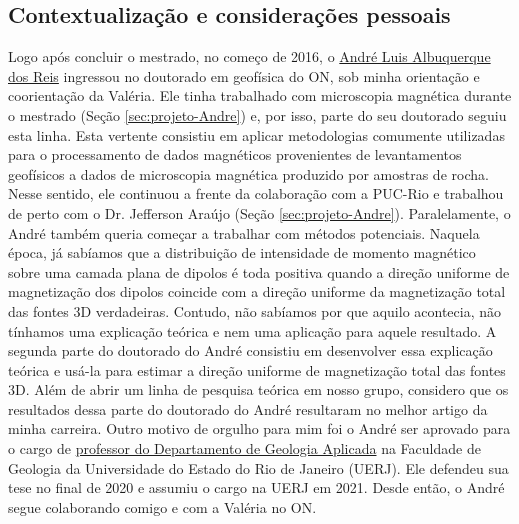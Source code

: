 \subsection*{Contextualização e considerações pessoais}

Logo após concluir o mestrado, no começo de 2016, o
\href{https://lattes.cnpq.br/1075610796165589}{André Luis Albuquerque dos Reis}
ingressou no doutorado em geofísica do ON, sob minha orientação e coorientação da
Valéria. Ele tinha trabalhado com microscopia magnética durante o
mestrado (Seção \ref{sec:projeto-Andre}) e, por isso, parte do seu doutorado seguiu esta
linha. Esta vertente consistiu em aplicar metodologias comumente utilizadas para o
processamento de dados magnéticos provenientes de levantamentos geofísicos a dados de
microscopia magnética produzido por amostras de rocha. Nesse sentido, ele continuou a 
frente da colaboração com a PUC-Rio e trabalhou de perto com o Dr. Jefferson Araújo
(Seção \ref{sec:projeto-Andre}).
Paralelamente, o André também queria começar a trabalhar com métodos potenciais.
Naquela época, já sabíamos que a distribuição de intensidade de momento magnético sobre
uma camada plana de dipolos é toda positiva quando a direção uniforme de magnetização dos
dipolos coincide com a direção uniforme da magnetização total das fontes 3D verdadeiras.
Contudo, não sabíamos por que aquilo acontecia, não tínhamos uma explicação teórica e
nem uma aplicação para aquele resultado. 
A segunda parte do doutorado do André consistiu em desenvolver
essa explicação teórica e usá-la para estimar a direção uniforme de magnetização total 
das fontes 3D. Além de abrir um linha de pesquisa teórica em nosso grupo, considero
que os resultados dessa parte do doutorado do André resultaram no melhor artigo da minha
carreira. Outro motivo de orgulho para mim foi o André ser aprovado para o cargo de
\href{https://www.fgel.uerj.br/site/departamentos/depto-de-geologia-aplicada/dgap-quadro-de-pessoal/}{professor do Departamento de Geologia Aplicada} 
na Faculdade de Geologia da Universidade do Estado do Rio de Janeiro (UERJ).
Ele defendeu sua tese no final de 2020 e assumiu o cargo na UERJ em 2021.
Desde então, o André segue colaborando comigo e com a Valéria no ON.

